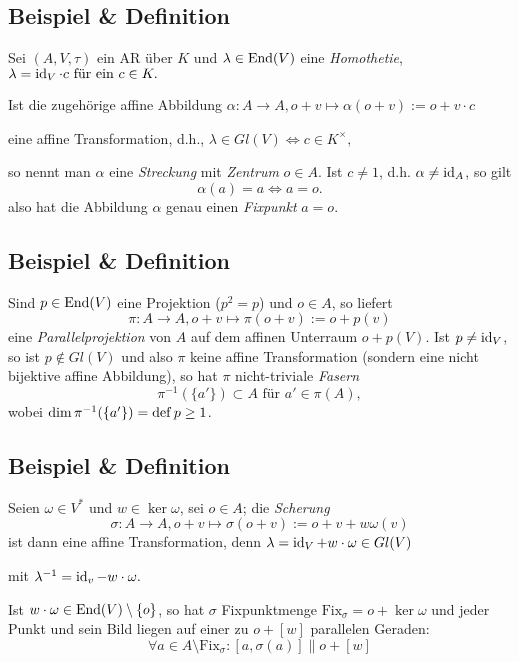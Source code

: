\subsection{Beispiel \& Definition}
	\begin{Definition}[Streckung]
	Sei $ (A,V,\tau) $ ein AR über $ K $ und $ \lambda\in\operatorname{End}(V) $ eine \emph{Homothetie},\hfill
		$ \lambda= \operatorname{id}_V\cdot c \text{ für ein }c\in K. $
		
	Ist die zugehörige affine Abbildung\hfill
		$ \alpha:A\to A,o+v\mapsto \alpha(o+v):= o+v\cdot c $
		
	eine affine Transformation, d.h.,\hfill
		$ \lambda \in Gl(V)\Leftrightarrow c\in K^\times, $
	
	so nennt man $ \alpha $ eine \emph{Streckung} mit \emph{Zentrum} $ o\in A $. Ist $ c\neq 1 $, d.h. $ \alpha \neq \operatorname{id}_A $, so gilt 
		\[ \alpha(a) = a\Leftrightarrow a = o. \]
	also hat die Abbildung $ \alpha $ genau einen \emph{Fixpunkt} $ a = o $.
	\end{Definition}
\subsection{Beispiel \& Definition}
	\begin{Definition}[Parallelprojektion]
	Sind $ p\in \operatorname{End}(V) $ eine Projektion ($ p^2 = p $) und $ o\in A $, so liefert
		\[ \pi:A\to A,o+v\mapsto \pi(o+v):= o+p(v) \]
	eine \emph{Parallelprojektion} von $ A $ auf dem affinen Unterraum $ o+p(V) $. Ist $ p\neq \operatorname{id}_V $, so ist $ p\notin Gl(V) $ und also $ \pi $ keine affine Transformation (sondern eine nicht bijektive affine Abbildung), so hat $ \pi $ nicht-triviale \emph{Fasern} 
		\[ \pi^{-1}(\{a'\})\subset A \text{ für } a'\in \pi(A), \]
	wobei $ \dim\pi^{-1}(\{a'\}) = \operatorname{def} p \geq 1 $.
	\end{Definition}
\subsection{Beispiel \& Definition}
	\begin{Definition}[Scherung]
	Seien $ \omega\in V^* $ und $ w\in \ker \omega $, sei $ o\in A $; die \emph{Scherung}
		\[ \sigma:A\to A, o+v\mapsto \sigma(o+v):= o+v+w\omega(v) \]
	ist dann eine affine Transformation, denn\hfill
		$ \lambda = \operatorname{id}_V + w\cdot \omega \in Gl(V) $
		
	mit\hfill
		$ \lambda^{-1} = \operatorname{id}_v - w\cdot \omega. $
	
	Ist $ w\cdot\omega\in\operatorname{End}(V)\setminus\{o\} $, so hat $ \sigma $ Fixpunktmenge $ \text{Fix}_\sigma = o+\ker\omega $ und jeder Punkt und sein Bild liegen auf einer zu $ o+[w] $ parallelen Geraden:
		\[ \forall a\in A\setminus \text{Fix}_\sigma : [a,\sigma(a)] \parallel o+[w] \]
	\end{Definition}

